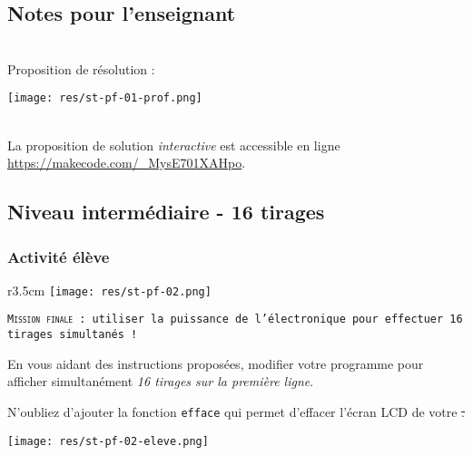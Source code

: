 \newpage

\subsection{Notes pour l'enseignant}

\begin{minipage}[t]{0.5\linewidth}
    \begin{methode}~\\
        Proposition de résolution :\\
        \centerline{\texttt{[image: res/st-pf-01-prof.png]}}
    \end{methode}
\end{minipage}
\hfill
\begin{minipage}[t]{0.5\linewidth}
    \begin{remarque}~\\
        La proposition de solution \emph{interactive} est accessible en ligne \url{https://makecode.com/_MysE701XAHpo}.
    \end{remarque}
\end{minipage}

%
%
\newpage
\subsection{Niveau intermédiaire - 16 tirages}
\subsubsection{Activité élève}



%
%
\begin{wrapfigure}[4]{r}{3.5cm}
    \texttt{[image: res/st-pf-02.png]}
\end{wrapfigure}

\begin{eleve}    
    \texttt{\textsc{Mission finale} : utiliser la puissance de l'électronique pour effectuer 16 tirages simultanés !}
    
    \begin{minipage}[t]{0.3\linewidth}\raggedright
        En vous aidant des instructions proposées, modifier votre programme pour afficher simultanément \emph{16 tirages sur la première ligne}.
    
        N'oubliez d'ajouter la fonction \texttt{efface} qui permet d'effacer l'écran LCD de votre \st. 
    \end{minipage}
    \hfill
    \begin{minipage}[t]{0.65\linewidth}
        \centering
        \vspace{0pt}
        \texttt{[image: res/st-pf-02-eleve.png]}
    \end{minipage}
\end{eleve}

